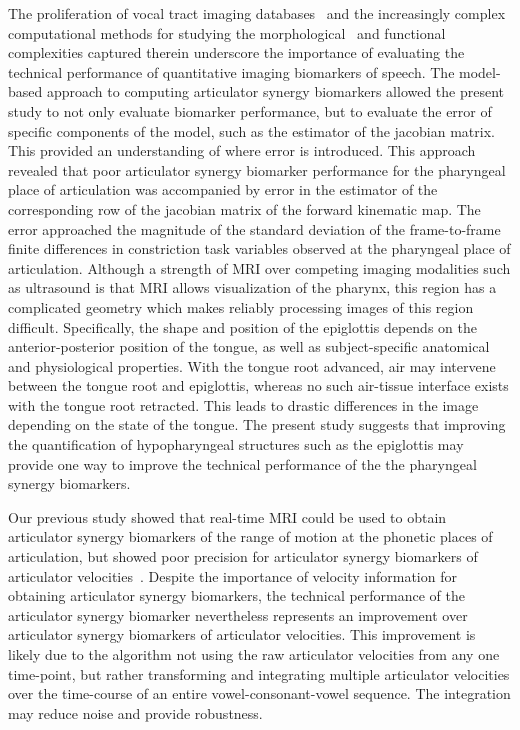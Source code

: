 \documentclass[reprint]{JASAnew}\usepackage[]{graphicx}\usepackage[]{color}
\begin{document}
The proliferation of vocal tract imaging databases~\citep{narayanan2014real,sorensen2017database} and the increasingly complex computational methods for studying the morphological~\citep{lammert2013morphological} and functional~\citep{dawson2016methods} complexities captured therein underscore the importance of evaluating the technical performance of quantitative imaging biomarkers of speech. The model-based approach to computing articulator synergy biomarkers allowed the present study to not only evaluate biomarker performance, but to evaluate the error of specific components of the model, such as the estimator of the jacobian matrix. This provided an understanding of where error is introduced. This approach revealed that poor articulator synergy biomarker performance for the pharyngeal place of articulation was accompanied by error in the estimator of the corresponding row of the jacobian matrix of the forward kinematic map. The error approached the magnitude of the standard deviation of the frame-to-frame finite differences in constriction task variables observed at the pharyngeal place of articulation. Although a strength of MRI over competing imaging modalities such as ultrasound is that MRI allows visualization of the pharynx, this region has a complicated geometry which makes reliably processing images of this region difficult. Specifically, the shape and position of the epiglottis depends on the anterior-posterior position of the tongue, as well as subject-specific anatomical and physiological properties. With the tongue root advanced, air may intervene between the tongue root and epiglottis, whereas no such air-tissue interface exists with the tongue root retracted. This leads to drastic differences in the image depending on the state of the tongue. The present study suggests that improving the quantification of hypopharyngeal structures such as the epiglottis may provide one way to improve the technical performance of the the pharyngeal synergy biomarkers.

Our previous study showed that real-time MRI could be used to obtain articulator synergy biomarkers of the range of motion at the phonetic places of articulation, but showed poor precision for articulator synergy biomarkers of articulator velocities~\citep{toger2017test}. Despite the importance of velocity information for obtaining articulator synergy biomarkers, the technical performance of the articulator synergy biomarker nevertheless represents an improvement over articulator synergy biomarkers of articulator velocities. This improvement is likely due to the algorithm not using the raw articulator velocities from any one time-point, but rather transforming and integrating multiple articulator velocities over the time-course of an entire vowel-consonant-vowel sequence. The integration may reduce noise and provide robustness. 
\end{document}
